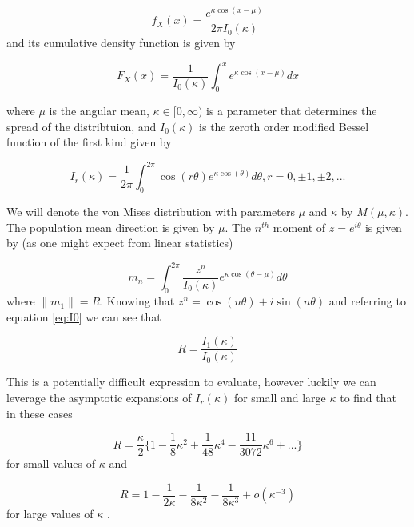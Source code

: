 \documentclass[12pt]{article}
\numberwithin{equation}{section}
\numberwithin{figure}{section}
\begin{document}
\begin{equation}\label{eq:vm}
f_{X}(x) = \frac{e^{\kappa \cos(x - \mu)}}{2\pi I_0(\kappa)}
\end{equation}
and its cumulative density function is given by \cite{Kanti}

\begin{equation}\label{eq:vmcdf}
F_X(x) = \frac{1}{I_0(\kappa)}\int_0^x e^{\kappa \cos(x-\mu)}dx
\end{equation}

where $\mu$ is the angular mean, $\kappa \in [0,\infty)$ is a parameter that determines the spread of the distribtuion, and $I_0(\kappa)$ is the zeroth order modified Bessel function of the first kind given by 

\begin{equation}\label{eq:I0}
I_r(\kappa) = \frac{1}{2\pi} \int_0^{2\pi}\cos( r \theta )e^{\kappa\cos(\theta )} d\theta, r = 0,\pm 1, \pm 2,...
\end{equation}

We will denote the von Mises distribution with parameters $\mu$ and $\kappa$ by $M(\mu, \kappa)$. The population mean direction is given by $\mu$. The $n^{th}$ moment of $z = e^{i \theta}$ is given by (as one might expect from linear statistics) 

\begin{equation} \label{eq:foo}
m_n = \int_0^{2\pi}  \frac{z^n }{I_0(\kappa)} e^{\kappa \cos(\theta-\mu)}d\theta
\end{equation}
where $\| m_1 \| = R$. Knowing that $z^n = \cos(n\theta)+i\sin(n\theta)$ and referring to equation \ref{eq:I0} we can see that 

\begin{equation}\label{eq:population R}
R = \frac{I_1(\kappa)}{I_0(\kappa)}
\end{equation}

This is a potentially difficult expression to evaluate, however luckily we can leverage the asymptotic expansions of $I_r(\kappa)$ for small and large $\kappa$ to find that in these cases

\begin{equation}\label{eq:smallkappa}
R = \frac{\kappa}{2}\{ 1-\frac{1}{8}\kappa^2+\frac{1}{48}\kappa^4-\frac{11}{3072}\kappa^6+... \}
\end{equation}
for small values of $\kappa$ and 

\begin{equation}\label{eq:largekappa}
R = 1-\frac{1}{2\kappa}-\frac{1}{8\kappa^2}-\frac{1}{8\kappa^3}+o(\kappa^{-3})
\end{equation}
for large values of $\kappa$ \cite{Kanti}.
\end{document}
